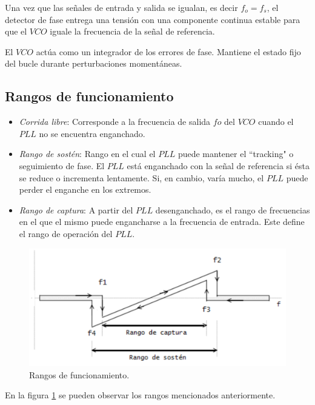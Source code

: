 \documentclass[twocolumn]{article}
\begin{document}
\begin{itemize}
Una vez que las señales de entrada y salida se igualan, es decir $f_o = f_s$, el detector de fase entrega una tensión con una componente continua estable para que el $VCO$ iguale la frecuencia de la señal de referencia.

El $VCO$ actúa como un integrador de los errores de fase. Mantiene el estado fijo del bucle durante perturbaciones momentáneas.
\end{itemize}

\subsection{Rangos de funcionamiento}
\begin{itemize}
	\item \textit{Corrida libre}: Corresponde a la frecuencia de salida $fo$ del $VCO$ cuando el $PLL$ no se encuentra enganchado.
	\item \textit{Rango de sostén}: Rango en el cual el $PLL$ puede mantener el ``tracking" o seguimiento de fase. El $PLL$ está enganchado con la señal de referencia si ésta se reduce o incrementa lentamente. Si, en cambio, varía mucho, el $PLL$ puede perder el enganche en los extremos.

	\item \textit{Rango de captura}: A partir del $PLL$ desenganchado, es el rango de frecuencias en el que el mismo puede engancharse a la frecuencia de entrada. Este define el rango de operación del $PLL$.
\end{itemize}

\begin{figure}[H]
  \centering    
  \includegraphics[width=\columnwidth]{imagenes/fig0.jpg}
	\caption{Rangos de funcionamiento.}\label{fig:fig0}
\end{figure}

En la figura \textcolor{blue}{{\ref{fig:fig0}}} se pueden observar los rangos mencionados anteriormente.
\end{document}
